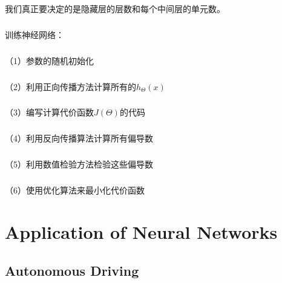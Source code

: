 \documentclass{article}
\begin{document}
\begin{CJK}{UTF8}{gbsn}
\paragraph{}
我们真正要决定的是隐藏层的层数和每个中间层的单元数。
\subparagraph{}
训练神经网络：
\subparagraph{}
（1）参数的随机初始化
\subparagraph{}
（2）利用正向传播方法计算所有的$h_\Theta(x)$
\subparagraph{}
（3）编写计算代价函数$J(\Theta)$的代码
\subparagraph{}
（4）利用反向传播算法计算所有偏导数
\subparagraph{}
（5）利用数值检验方法检验这些偏导数
\subparagraph{}
（6）使用优化算法来最小化代价函数
\section{Application of Neural Networks}
\subsection{Autonomous Driving}
\end{CJK}
\end{document}
